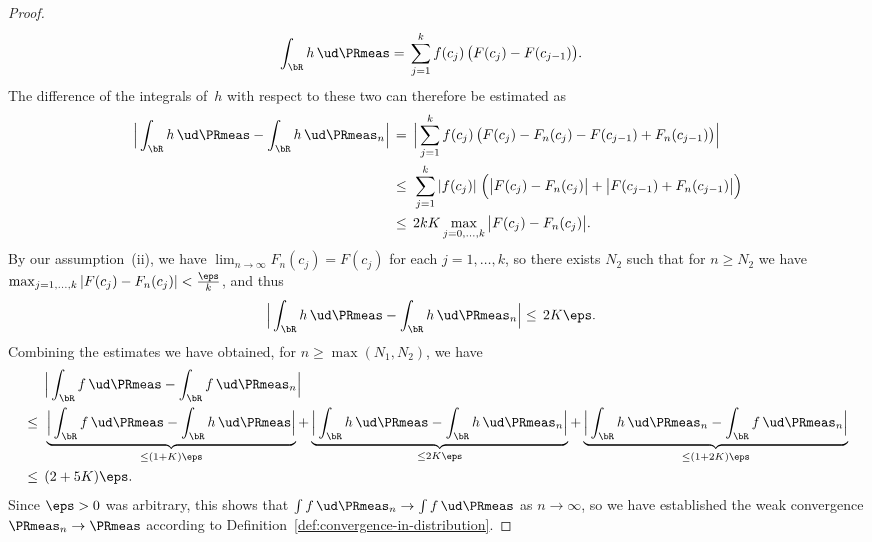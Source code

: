 \begin{proof}
\begin{align*}
  \int_{\bR} h \, \ud \PRmeas
  = \; & \sum_{j=1}^k f(c_j) \, \big( F(c_j) - F(c_{j-1}) \big) .
  \end{align*}
  The difference of the integrals of~$h$ with respect to these two can
  therefore be estimated as
  \begin{align*}
  \Big| \int_{\bR} h \, \ud \PRmeas - \int_{\bR} h \, \ud \PRmeas_n \Big|
  \, = \; & \, \Big| \sum_{j=1}^k f(c_j) \,
      \big( F(c_j) - F_n(c_j) - F(c_{j-1}) +  F_n (c_{j-1}) \big) \Big| \\
  \leq \; & \, \sum_{j=1}^k |f(c_j)| \; \Big(
      \big| F(c_j) - F_n(c_j) \big| + \big| F(c_{j-1}) +  F_n (c_{j-1}) \big|
      \Big) \\
  \leq \; & \, 2 k K \max_{j = 0 , \ldots , k} \big| F(c_j) - F_n(c_j) \big| .
  \end{align*}
  By our assumption~\textup{(ii)}, we have
  $\lim_{n \to \infty} F_n(c_j) = F(c_j)$ for each $j = 1 , \ldots, k$, so
  there exists $N_2$ such that for $n \geq N_2$ we have
  $\max_{j = 1 , \ldots , k} | F(c_j) - F_n(c_j) | < \frac{\eps}{k}$, and
  thus
  \begin{align*}
  \Big| \int_{\bR} h \, \ud \PRmeas - \int_{\bR} h \, \ud \PRmeas_n \Big|
  \leq \; & \, 2 K \eps .
  \end{align*}
  Combining the estimates we have obtained, for $n \geq \max(N_1 , N_2)$, we have
  \begin{align*}
  & \Big| \int_{\bR} f \, \ud \PRmeas - \int_{\bR} f \, \ud \PRmeas_n \Big| \\
  \leq \; \, &
      \underbrace{
      \Big| \int_{\bR} f \, \ud \PRmeas - \int_{\bR} h \, \ud \PRmeas \Big|}_{
          \leq (1+K) \eps}
      + \underbrace{
      \Big| \int_{\bR} h \, \ud \PRmeas - \int_{\bR} h \, \ud \PRmeas_n \Big|}_{
          \leq 2 K \eps}
      + \underbrace{
      \Big| \int_{\bR} h \, \ud \PRmeas_n - \int_{\bR} f \, \ud \PRmeas_n	\Big|}_{
          \leq (1+2K) \eps } \\
  \leq \; \, & (2 + 5 K) \eps .
  \end{align*}
  Since $\eps > 0$ was arbitrary, this shows that
  $\int f \, \ud \PRmeas_n \to \int f \, \ud \PRmeas$ as $n \to \infty$, so we
  have established the weak convergence $\PRmeas_n \to \PRmeas$
  according to Definition~\ref{def:convergence-in-distribution}.
\end{proof}

